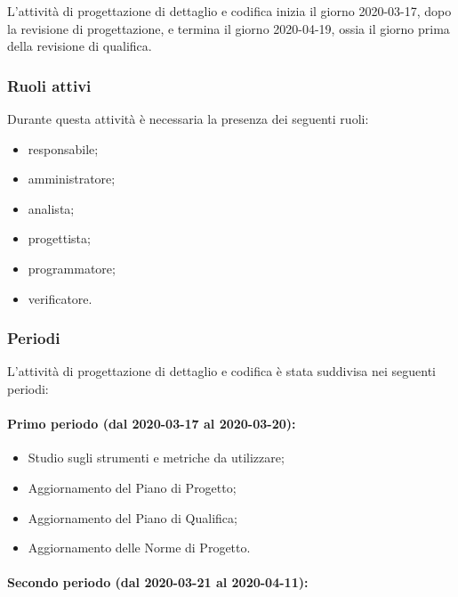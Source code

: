 			L'attività di progettazione di dettaglio e codifica inizia il giorno 2020-03-17, dopo la revisione di progettazione, e termina il giorno 2020-04-19, ossia il giorno prima della revisione di qualifica.
			
			\subsubsection{Ruoli attivi}
			
				Durante questa attività è necessaria la presenza dei seguenti ruoli:
				\begin{itemize}
					\item responsabile;
					\item amministratore;
					\item analista;
					\item progettista;
					\item programmatore;
					\item verificatore.
				\end{itemize}
			
			\subsubsection{Periodi}
			
				L'attività di progettazione di dettaglio e codifica è stata suddivisa nei seguenti periodi:
				
				\paragraph{Primo periodo (dal 2020-03-17 al 2020-03-20):}
				
					\begin{itemize}
						\item Studio sugli strumenti e metriche da utilizzare;
					 	\item Aggiornamento del Piano di Progetto;
					 	\item Aggiornamento del Piano di Qualifica;
					 	\item Aggiornamento delle Norme di Progetto.
					\end{itemize} 	
				
				\paragraph{Secondo periodo (dal 2020-03-21 al 2020-04-11):}
				
